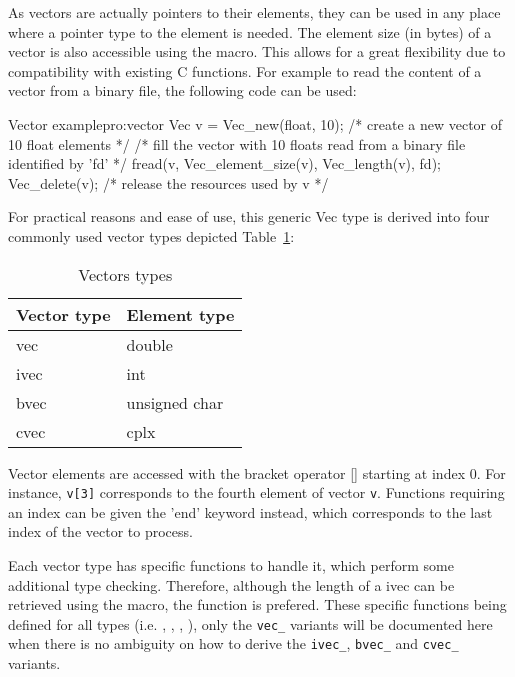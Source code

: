      As vectors are actually pointers to their elements, they can be used in
     any place where a pointer type to the element is needed. The element size
     (in bytes) of a vector is also accessible using the 
     macro. This allows for a great flexibility due to compatibility with
     existing C functions. For example to read the content of a vector from a 
     binary file, the following code can be used:


\begin{program}{Vector example}{pro:vector}
Vec v = Vec_new(float, 10); /* create a new vector of 10 float elements */
/* fill the vector with 10 floats read from a binary file identified by 'fd' */
fread(v, Vec_element_size(v), Vec_length(v), fd); 
Vec_delete(v);              /* release the resources used by v */
\end{program}

      For practical reasons and ease of use, this generic Vec type is derived
      into four commonly used vector types depicted Table~\ref{tab:vectortypes}:


\begin{table}
\begin{center}
\begin{tabular}{|p{5cm}p{5cm}|}
\hline
       Vector type &  Element type \\
\hline
          vec &	  double \\
          ivec &  int \\
          bvec &  unsigned char \\
          cvec &  cplx \\
\hline
\end{tabular}
\label{tab:vectortypes}
\caption{Vectors types}
\end{center}
\end{table}

  Vector elements are accessed with the bracket operator []
    starting at index $0$. For instance, \texttt{v[3]} corresponds to the fourth
    element of vector \texttt{v}.  Functions requiring an index can be given
    the 'end' keyword instead, which corresponds to the last index of
    the vector to process.  

  Each vector type has specific functions to handle it, which perform
    some additional type checking. Therefore, although the length of a
    ivec can be retrieved using the  macro, the
     function is prefered. These specific
    functions being defined for all types
    (i.e. , ,
    , ), only the
    \texttt{vec\_} variants will be documented here when there is no
    ambiguity on how to derive the \texttt{ivec\_}, \texttt{bvec\_} and
    \texttt{cvec\_} variants.

